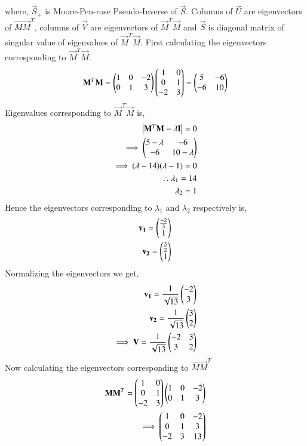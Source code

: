 \documentclass[journal,12pt,twocolumn]{IEEEtran}
\begin{document}
where, $\vec{S}_+$ is Moore-Pen-rose Pseudo-Inverse of $\vec{S}$. Columns of $\vec{U}$ are eigenvectors of $\vec{MM}^T$, columns of $\vec{V}$ are eigenvectors of $\vec{M}^T\vec{M}$ and $\vec{S}$ is diagonal matrix of singular value of eigenvalues of $\vec{M}^T\vec{M}$. First calculating the eigenvectors corresponding to $\vec{M}^T\vec{M}$.
\begin{align}
\mathbf{M}^T\mathbf{M} =  \begin{pmatrix}1&0&-2\\0&1&3\end{pmatrix} \begin{pmatrix}1&0\\0&1\\-2&3\end{pmatrix} = \begin{pmatrix}5&-6\\-6&10\end{pmatrix}
\end{align}
Eigenvalues corresponding to $\vec{M}^T\vec{M}$  is,
\begin{align}
\begin{vmatrix}\mathbf{M}^T\mathbf{M}-\lambda\mathbf{I}\end{vmatrix} = 0\\
\implies \begin{pmatrix}5-\lambda&-6\\-6&10-\lambda\end{pmatrix}\\
\implies (\lambda-14)(\lambda-1) = 0\\
\therefore \lambda_1 = 14 \label{lambda1}\\ 
\lambda_2 = 1\label{lambda2}
\end{align} 
Hence the eigenvectors corresponding to $\lambda_1$ and $\lambda_2$ respectively is,
\begin{align}
\mathbf{v_1} =\begin{pmatrix}\frac{-2}{3}\\1\end{pmatrix}\\
\mathbf{v_2} =\begin{pmatrix}\frac{3}{2}\\1\end{pmatrix}
\end{align}
Normalizing the eigenvectors we get,
\begin{align}
\mathbf{v_1} = \frac{1}{\sqrt{13}}\begin{pmatrix}-2\\3\end{pmatrix}\\
\mathbf{v_2} = \frac{1}{\sqrt{13}}\begin{pmatrix}3\\2\end{pmatrix}\\
\implies \mathbf{V} = \frac{1}{\sqrt{13}}\begin{pmatrix}-2&3\\3&2\end{pmatrix}\label{V}
\end{align}
Now calculating the eigenvectors corresponding to $\vec{MM}^T$
\begin{align}
\mathbf{MM}^T = \begin{pmatrix}1&0\\0&1\\-2&3\end{pmatrix}\begin{pmatrix}1&0&-2\\0&1&3\end{pmatrix} \\\implies \begin{pmatrix}1&0&-2\\0&1&3\\-2&3&13\end{pmatrix}
\end{align}
\end{document}

